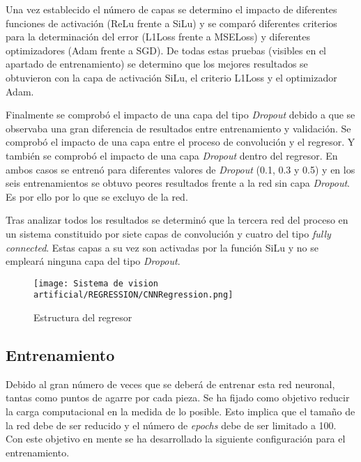 Una vez establecido el número de capas se determino el impacto de diferentes funciones de activación (ReLu frente a SiLu) y se comparó diferentes criterios para la determinación del error (L1Loss frente a MSELoss) y diferentes optimizadores (Adam frente a SGD). De todas estas pruebas (visibles en el apartado de entrenamiento) se determino que los mejores resultados se obtuvieron con la capa de activación SiLu, el criterio L1Loss y el optimizador Adam.

Finalmente se comprobó el impacto de una capa del tipo \textit{Dropout} debido a que se observaba una gran diferencia de resultados entre entrenamiento y validación. Se comprobó el impacto de una capa entre el proceso de convolución y el regresor. Y también se comprobó el impacto de una capa \textit{Dropout} dentro del regresor. En ambos casos se entrenó para diferentes valores de \textit{Dropout} (0.1, 0.3 y 0.5) y en los seis entrenamientos se obtuvo peores resultados frente a la red sin capa \textit{Dropout}. Es por ello por lo que se excluyo de la red.

Tras analizar todos los resultados se determinó que la tercera red del proceso en un sistema constituido por siete capas de convolución y cuatro del tipo \textit{fully connected}. Estas capas a su vez son activadas por la función SiLu y no se empleará ninguna capa del tipo \textit{Dropout}.


\begin{figure}[ht]
	\centering
	\texttt{[image: Sistema de vision artificial/REGRESSION/CNNRegression.png]}
	\caption{Estructura del regresor}
	\label{chap:Sistema de visión artificial fig:Estructura Regresor}
\end{figure}

\subsection{Entrenamiento}
\label{chap:Sistema de visión artificial sec:Regresor Entrenamiento}
Debido al gran número de veces que se deberá de entrenar esta red neuronal, tantas como puntos de agarre por cada pieza. Se ha fijado como objetivo reducir la carga computacional en la medida de lo posible. Esto implica que el tamaño de la red debe de ser reducido y el número de \textit{epochs} debe de ser limitado a 100. Con este objetivo en mente se ha desarrollado la siguiente configuración para el entrenamiento.

